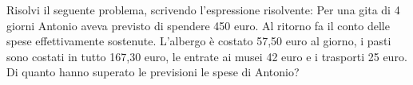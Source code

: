 \item Risolvi il seguente problema, scrivendo l'espressione risolvente: Per una gita di 4 giorni Antonio aveva previsto di spendere 450 euro. Al ritorno fa il conto delle spese effettivamente sostenute. L'albergo è costato 57,50 euro al giorno, i pasti sono costati in tutto 167,30 euro, le entrate ai musei 42 euro e i trasporti 25 euro. Di quanto hanno superato le previsioni le spese di Antonio?